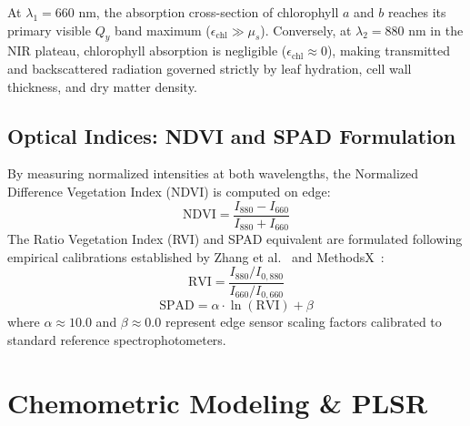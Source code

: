 \documentclass[9pt,twocolumn,a4paper,landscape]{article}
\begin{document}
At $\lambda_1 = 660\text{ nm}$, the absorption cross-section of chlorophyll $a$ and $b$ reaches its primary visible $Q_y$ band maximum ($\epsilon_{\text{chl}} \gg \mu_s$). Conversely, at $\lambda_2 = 880\text{ nm}$ in the NIR plateau, chlorophyll absorption is negligible ($\epsilon_{\text{chl}} \approx 0$), making transmitted and backscattered radiation governed strictly by leaf hydration, cell wall thickness, and dry matter density.

\subsection{Optical Indices: NDVI and SPAD Formulation}
By measuring normalized intensities at both wavelengths, the Normalized Difference Vegetation Index (NDVI) is computed on edge:
\begin{equation}
    \text{NDVI} = \frac{I_{880} - I_{660}}{I_{880} + I_{660}}
    \label{eq:ndvi}
\end{equation}
The Ratio Vegetation Index (RVI) and SPAD equivalent are formulated following empirical calibrations established by Zhang et al.~\cite{zhang2022spad} and MethodsX~\cite{methodsx2024coffee}:
\begin{equation}
    \text{RVI} = \frac{I_{880} / I_{0,880}}{I_{660} / I_{0,660}}
    \label{eq:rvi}
\end{equation}
\begin{equation}
    \text{SPAD} = \alpha \cdot \ln(\text{RVI}) + \beta
    \label{eq:spad}
\end{equation}
where $\alpha \approx 10.0$ and $\beta \approx 0.0$ represent edge sensor scaling factors calibrated to standard reference spectrophotometers.

\section{Chemometric Modeling \& PLSR}
\label{sec:chemometrics}
\end{document}

